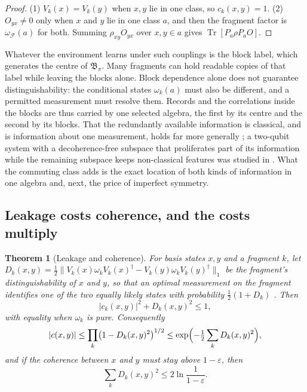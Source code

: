 \documentclass[12pt,a4paper]{article}
\newtheorem{theorem}{Theorem}[section]
\newcommand{\B}{\mathfrak B}
\newcommand{\Tr}{\operatorname{Tr}}
\begin{document}
\begin{proof}
(1) $V_k(x)=V_k(y)$ when $x,y$ lie in one class, so $c_k(x,y)=1$. (2) $O_{yx}\ne0$ only when $x$ and $y$ lie in one class $a$, and then the fragment factor is $\omega_{\mathcal F}(a)$ for both. Summing $\rho_{xy}O_{yx}$ over $x,y\in a$ gives $\Tr[P_a\rho P_aO]$.
\end{proof}

Whatever the environment learns under such couplings is the block label, which generates the centre of $\B_\pi$. Many fragments can hold readable copies of that label while leaving the blocks alone. Block dependence alone does not guarantee distinguishability: the conditional states $\omega_k(a)$ must also be different, and a permitted measurement must resolve them. Records and the correlations inside the blocks are thus carried by one selected algebra, the first by its centre and the second by its blocks. That the redundantly available information is classical, and is information about one measurement, holds far more generally \cite{BrandaoPianiHorodecki2015}; a two-qubit system with a decoherence-free subspace that proliferates part of its information while the remaining subspace keeps non-classical features was studied in \cite{Cakmak2021}. What the commuting class adds is the exact location of both kinds of information in one algebra and, next, the price of imperfect symmetry.

\subsection{Leakage costs coherence, and the costs multiply}

\begin{theorem}[Leakage and coherence]
\label{thm:leak}
For basis states $x,y$ and a fragment $k$, let
$D_k(x,y)=\tfrac12\bigl\|V_k(x)\omega_kV_k(x)^\dagger-V_k(y)\omega_kV_k(y)^\dagger\bigr\|_1$
be the fragment's distinguishability of $x$ and $y$, so that an optimal measurement on the fragment identifies one of the two equally likely states with probability $\tfrac12(1+D_k)$ \cite{Helstrom1976}. Then
\begin{equation}
|c_k(x,y)|^2+D_k(x,y)^2\le1,
\label{eq:englert}
\end{equation}
with equality when $\omega_k$ is pure. Consequently
\begin{equation}
|c(x,y)|\le\prod_k\bigl(1-D_k(x,y)^2\bigr)^{1/2}\le\exp\Bigl(-\tfrac12\sum_kD_k(x,y)^2\Bigr),
\label{eq:product}
\end{equation}
and if the coherence between $x$ and $y$ must stay above $1-\varepsilon$, then
\begin{equation}
\sum_kD_k(x,y)^2\le2\ln\frac1{1-\varepsilon}.
\label{eq:budget}
\end{equation}
\end{theorem}
\end{document}
